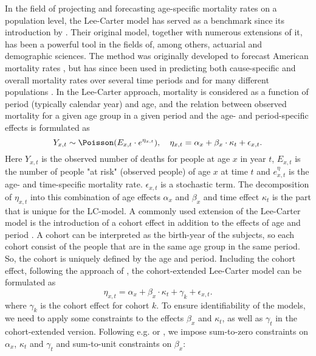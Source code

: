 In the field of projecting and forecasting age-specific mortality rates on a population level, the Lee-Carter model has served as a benchmark since its introduction by \citet{LeeCarter1992}. Their original model, together with numerous extensions of it, has been a powerful tool in the fields of, among others, actuarial and demographic sciences\cite{booth_tickle_2008}. The method was originally developed to forecast American mortality rates \cite{LeeCarter1992}, but has since been used in predicting both cause-specific and overall mortality rates over several time periods and for many different populations \cite{GirosiKing2007}. 
In the Lee-Carter approach, mortality is considered as a function of period (typically calendar year) and age, and the relation between observed mortality for a given age group in a given period and the age- and period-specific effects is formulated as 
\begin{equation}
Y_{x,t} \sim \Poisson(E_{x,t}\cdot e^{\eta_{x,t}}), \quad \eta_{x,t}= \alpha_x + \beta_x\cdot\kappa_t + \epsilon_{x,t}.
\label{eq:LC-model}
\end{equation}
Here $Y_{x,t}$ is the observed number of deaths for people at age $x$ in year $t$, $E_{x,t}$ is the number of people "at risk" (observed people) of age $x$ at time $t$ and $e^\eta_{x,t}$ is the age- and time-specific mortality rate. $\epsilon_{x,t}$ is a stochastic term. The decomposition of $\eta_{x,t}$ into this combination of age effects $\alpha_x$ and $\beta_x$ and time effect $\kappa_t$ is the part that is unique for the LC-model.
\newline
\noindent A commonly used extension of the Lee-Carter model is the introduction of a cohort effect in addition to the effects of age and period \cite{Wisniowski2015}. A cohort can be interpreted as the birth-year of the subjects, so each cohort consist of the people that are in the same age group in the same period. So, the cohort is uniquely defined by the age and period. Including the cohort effect, following the approach of \citet{Wisniowski2015}, the cohort-extended Lee-Carter model can be formulated as
\begin{equation}
    \eta_{x,t} = \alpha_x + \beta_x \cdot \kappa_t + \gamma_k + \epsilon_{x,t}.
    \label{eq:LCC-model}
\end{equation}
where $\gamma_k$ is the cohort effect for cohort $k$. 
To ensure identifiability of the models, we need to apply some constraints to the effects $\beta_x$ and $\kappa_t$, as well as $\gamma_t$ in the cohort-extended version. Following e.g. \citet{Wisniowski2015} or \citet{LeeCarter1992}, we impose sum-to-zero constraints on $\alpha_x$, $\kappa_t$ and $\gamma_t$ and sum-to-unit constraints on $\beta_x$:
